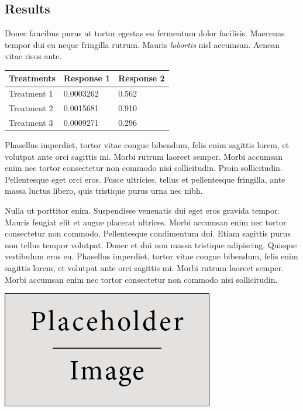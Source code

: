 \documentclass[a0,portrait]{a0poster}
\begin{document}
\begin{multicols}{2}
\section*{Results}

Donec faucibus purus at tortor egestas eu fermentum dolor facilisis. Maecenas tempor dui eu neque fringilla rutrum. Mauris \emph{lobortis} nisl accumsan. Aenean vitae risus ante.
%
\begin{table} %
\begin{tabular}{l l l}
\toprule
\textbf{Treatments} & \textbf{Response 1} & \textbf{Response 2}\\
\midrule
Treatment 1 & 0.0003262 & 0.562 \\
Treatment 2 & 0.0015681 & 0.910 \\
Treatment 3 & 0.0009271 & 0.296 \\
\bottomrule
\end{tabular}
\end{table}
%
Phasellus imperdiet, tortor vitae congue bibendum, felis enim sagittis lorem, et volutpat ante orci sagittis mi. Morbi rutrum laoreet semper. Morbi accumsan enim nec tortor consectetur non commodo nisi sollicitudin. Proin sollicitudin. Pellentesque eget orci eros. Fusce ultricies, tellus et pellentesque fringilla, ante massa luctus libero, quis tristique purus urna nec nibh.

Nulla ut porttitor enim. Suspendisse venenatis dui eget eros gravida tempor. Mauris feugiat elit et augue placerat ultrices. Morbi accumsan enim nec tortor consectetur non commodo. Pellentesque condimentum dui. Etiam sagittis purus non tellus tempor volutpat. Donec et dui non massa tristique adipiscing. Quisque vestibulum eros eu. Phasellus imperdiet, tortor vitae congue bibendum, felis enim sagittis lorem, et volutpat ante orci sagittis mi. Morbi rutrum laoreet semper. Morbi accumsan enim nec tortor consectetur non commodo nisi sollicitudin.

\begin{center}\vspace{1cm}
\includegraphics[width=0.8\linewidth]{placeholder}
\end{center}\vspace{1cm}


\end{multicols}
\end{document}
